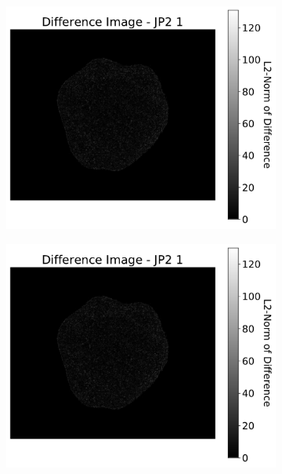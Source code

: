 \begin{figure}[htb]
\begin{subfigure}[b]{0.48\textwidth}
        \caption{}
        \label{fig:img_quality_comp_jp2_1_histo}
    \end{subfigure}
    \\
    \begin{subfigure}[b]{0.48\textwidth}
        \centering
        \includegraphics[width=\textwidth]{doc/thesis/0_figures/compare_quality/set1/jp2_1_diff_heatmap}
        \caption{}
        \label{fig:img_quality_comp_jp2_1_diff}
    \end{subfigure}
    \begin{subfigure}[b]{0.48\textwidth}
        \centering
        \includegraphics[width=\textwidth]{doc/thesis/0_figures/compare_quality/set1/jp2_1_diff_heatmap_rel}

\end{subfigure}
\end{figure}
